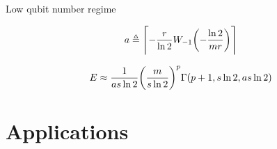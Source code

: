 \documentclass[9pt, handout, aspectratio=169]{beamer}	%
\begin{document}
\begin{frame}{Low qubit number regime}
\begin{multicols}{2}
	\end{multicols}
	\vspace{-3em}
	\begin{multicols}{2}

		\begin{gather*}
			a \defeq \ceil*{- \frac{r}{\ln{2}} W_{-1}\qty(-\frac{\ln{2}}{mr})}
		\end{gather*}

		\columnbreak

		\begin{gather*}
			E \approx \frac{1}{as\ln{2}} \qty(\frac{m}{s\ln{2}})^p
				\Gamma \qty(p+1, s\ln{2}, as\ln{2}) \label{eq:QSR-efficiency}
		\end{gather*}

	\end{multicols}


\end{frame}


\section{Applications}
\end{document}

